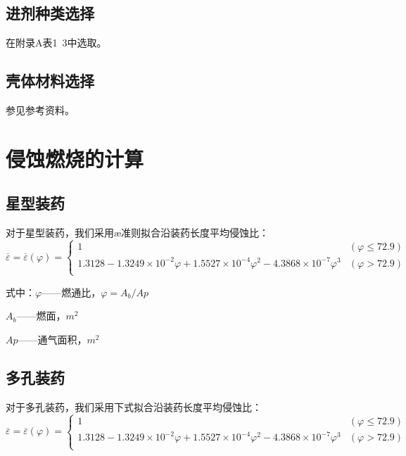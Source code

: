 \subsection{进剂种类选择}

在附录A表1~3中选取。

\subsection{壳体材料选择}


参见参考资料\citep{wangyouyuan}。

\section{侵蚀燃烧的计算}

\subsection{星型装药}

对于星型装药，我们采用æ准则拟合沿装药长度平均侵蚀比：
\[
    \overline{\varepsilon }=\overline{\varepsilon }\left( \varphi \right) =\left\{ \begin{matrix}
        1&		(\varphi \le 72.9)\\
        1.3128-1.3249\times 10^{-2}\varphi +1.5527\times 10^{-4}\varphi ^2-4.3868\times 10^{-7}\varphi ^3&		(\varphi >72.9)\\
    \end{matrix} \right. 
\]

式中：$\varphi$——燃通比，$\varphi=A_{b}/A{p}$

\qquad\quad$A_{b}$——燃面，$m^{2}$

\qquad\quad$A{p}$——通气面积，$m^{2}$

\subsection{多孔装药}

对于多孔装药，我们采用下式拟合沿装药长度平均侵蚀比：
\[
    \overline{\varepsilon }=\overline{\varepsilon }\left( \varphi \right) =\left\{ \begin{matrix}
        1&		(\varphi \le 72.9)\\
        1.3128-1.3249\times 10^{-2}\varphi +1.5527\times 10^{-4}\varphi ^2-4.3868\times 10^{-7}\varphi ^3&		(\varphi >72.9)\\
    \end{matrix} \right. 
\]